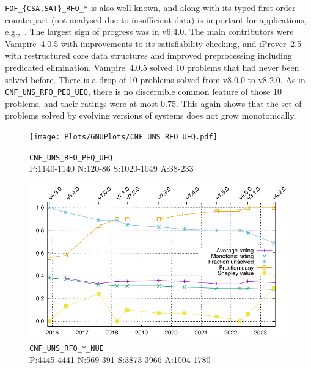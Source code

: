 \documentclass[runningheads]{llncs}
\begin{document}
{\tt FOF\_\{CSA,SAT\}\_RFO\_*} is also well known, and along with its typed first-order
counterpart (not analysed due to insufficient data) is important for applications, 
e.g.,~\cite{DKW08}.
The largest sign of progress was in v6.4.0.
The main contributors were Vampire~4.0.5 with improvements to its satisfiability checking,
and iProver~2.5 with restructured core data structures and improved preprocessing including 
predicated elimination.
Vampire~4.0.5 solved 10 problems that had never been solved before.
There is a drop of 10 problems solved from v8.0.0 to v8.2.0.
As in {\tt CNF\_UNS\_RFO\_PEQ\_UEQ}, there is no discernible common feature of those 10 problems,
and their ratings were at most 0.75.
This again shows that the set of problems solved by evolving versions of systems does not grow
monotonically.

\begin{figure}[b!]
\centering
\begin{minipage}[t]{.49\textwidth}
  \centering
  \texttt{[image: Plots/GNUPlots/CNF\_UNS\_RFO\_UEQ.pdf]}
  \vspace*{-2em}
  \caption{{\tt CNF\_UNS\_RFO\_PEQ\_UEQ} \\ 
           {\scriptsize P:1140-1140 N:120-86 S:1020-1049 A:38-233}}
  \label{Plot_CNF_UEQ}
\end{minipage}
\begin{minipage}[t]{.49\textwidth}
  \centering
  \includegraphics[width=\textwidth]{Plots/GNUPlots/CNF_UNS_RFO_NUE.pdf}
  \vspace*{-2em}
  \caption{{\tt CNF\_UNS\_RFO\_*\_NUE} \\
           {\scriptsize P:4445-4441 N:569-391 S:3873-3966 A:1004-1780}}
  \label{Plot_CNF_UNS}
\end{minipage}
\begin{minipage}[t]{.49\textwidth}

\end{minipage}
\end{figure}
\end{document}
